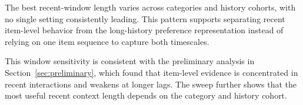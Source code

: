 ﻿\documentclass[sigconf,anonymous,review]{acmart}
\begin{document}
The best recent-window length varies across categories and history cohorts, with no single setting consistently leading. This pattern supports separating recent item-level behavior from the long-history preference representation instead of relying on one item sequence to capture both timescales.

This window sensitivity is consistent with the preliminary analysis in Section~\ref{sec:preliminary}, which found that item-level evidence is concentrated in recent interactions and weakens at longer lags. The sweep further shows that the most useful recent context length depends on the category and history cohort.

\begin{table}[!tbp]
    \centering
    \setlength{\tabcolsep}{3.2pt}
    \renewcommand{\arraystretch}{1.12}
\end{table}
\end{document}
